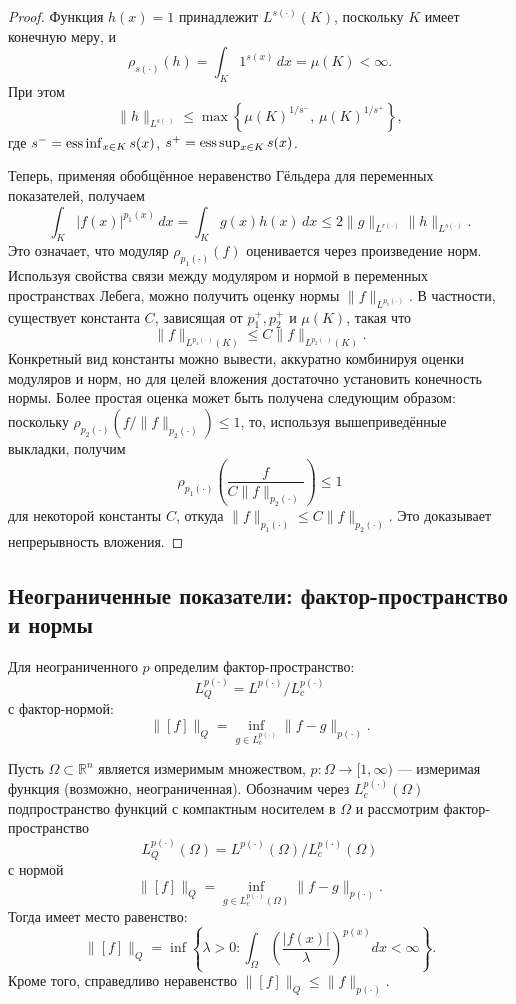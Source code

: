 \documentclass[../NDCNNAI_main.tex]{subfiles}
\begin{document}
\begin{proof}
Функция \( h(x) = 1 \) принадлежит \( L^{s(\cdot)}(K) \), поскольку \( K \) имеет конечную меру, и
\[
\rho_{s(\cdot)}(h) = \int_K 1^{s(x)} \, dx = \mu(K) < \infty.
\]
При этом
\[
\| h \|_{L^{s(\cdot)}} \leq \max\left\{ \mu(K)^{1/s^-}, \, \mu(K)^{1/s^+} \right\},
\]
где \( s^- = \operatorname*{ess\,inf}_{x \in K} s(x) \), \( s^+ = \operatorname*{ess\,sup}_{x \in K} s(x) \).

Теперь, применяя обобщённое неравенство Гёльдера для переменных показателей, получаем
\[
\int_K |f(x)|^{p_1(x)} \, dx = \int_K g(x) h(x) \, dx \leq 2 \| g \|_{L^{r(\cdot)}} \| h \|_{L^{s(\cdot)}}.
\]
Это означает, что модуляр \( \rho_{p_1(\cdot)}(f) \) оценивается через произведение норм. Используя свойства связи между модуляром и нормой в переменных пространствах Лебега, можно получить оценку нормы \( \| f \|_{L^{p_1(\cdot)}} \). В частности, существует константа \( C \), зависящая от \( p_1^+, p_2^+ \) и \( \mu(K) \), такая что
\[
\| f \|_{L^{p_1(\cdot)}(K)} \leq C \| f \|_{L^{p_2(\cdot)}(K)}.
\]
Конкретный вид константы можно вывести, аккуратно комбинируя оценки модуляров и норм, но для целей вложения достаточно установить конечность нормы. Более простая оценка может быть получена следующим образом: поскольку \( \rho_{p_2(\cdot)}(f/\|f\|_{p_2(\cdot)}) \leq 1 \), то, используя вышеприведённые выкладки, получим
\[
\rho_{p_1(\cdot)}\left( \frac{f}{C \|f\|_{p_2(\cdot)}} \right) \leq 1
\]
для некоторой константы \( C \), откуда \( \| f \|_{p_1(\cdot)} \leq C \| f \|_{p_2(\cdot)} \). Это доказывает непрерывность вложения.
\end{proof}

\subsection{Неограниченные показатели: фактор-пространство и нормы}

\begin{definition}
Для неограниченного \( p \) определим фактор-пространство:
\[
L_Q^{p(\cdot)} = L^{p(\cdot)} / L_c^{p(\cdot)}
\]
с фактор-нормой:
\[
\|[f]\|_Q = \inf_{g \in L_c^{p(\cdot)}} \|f - g\|_{p(\cdot)}.
\]
\end{definition}

\begin{theorem}
Пусть \( \Omega \subset \mathbb{R}^n \) является измеримым множеством, \( p \colon \Omega \to [1, \infty) \) --- измеримая функция (возможно, неограниченная). Обозначим через \( L_c^{p(\cdot)}(\Omega) \) подпространство функций с компактным носителем в \( \Omega \) и рассмотрим фактор-пространство 
\[
L_Q^{p(\cdot)}(\Omega) = L^{p(\cdot)}(\Omega) / L_c^{p(\cdot)}(\Omega)
\]
с нормой
\[
\|[f]\|_Q = \inf_{g \in L_c^{p(\cdot)}(\Omega)} \|f - g\|_{p(\cdot)}.
\]
Тогда имеет место равенство:
\[
\|[f]\|_Q = \inf \left\{ \lambda > 0 \colon \int_{\Omega} \left( \frac{|f(x)|}{\lambda} \right)^{p(x)} dx < \infty \right\}.
\]
Кроме того, справедливо неравенство \( \|[f]\|_Q \leq \|f\|_{p(\cdot)} \).
\end{theorem}
\end{document}
